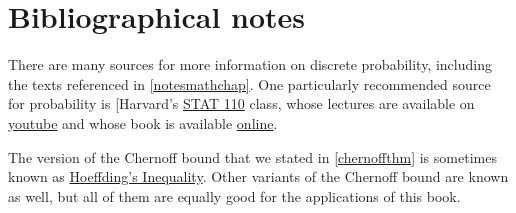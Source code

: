 \hypertarget{exidtwo}{}

\section{Bibliographical notes}\label{Bibliographical-notes}

There are many sources for more information on discrete probability,
including the texts referenced in \cref{notesmathchap}. One particularly
recommended source for probability is {[}Harvard's
\href{https://projects.iq.harvard.edu/stat110/home}{STAT 110} class,
whose lectures are available on
\href{https://projects.iq.harvard.edu/stat110/youtube}{youtube} and
whose book is available \href{http://probabilitybook.net}{online}.

The version of the Chernoff bound that we stated in \cref{chernoffthm}
is sometimes known as
\href{https://en.wikipedia.org/wiki/Hoeffding\%27s_inequality}{Hoeffding's
Inequality}. Other variants of the Chernoff bound are known as well, but
all of them are equally good for the applications of this book.
